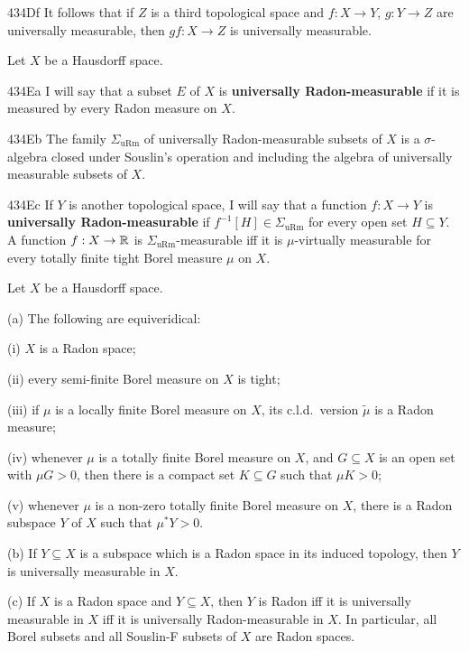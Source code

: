 \spheader 434Df It follows that if $Z$ is a third topological space
and $f:X\to Y$, $g:Y\to Z$ are universally measurable, then $gf:X\to Z$
is universally measurable.

 Let $X$ be a Hausdorff space.

\spheader 434Ea I will say that a
subset $E$ of $X$ is {\bf universally Radon-measurable} if it is
measured by every Radon measure on $X$.

\spheader 434Eb The family
$\Sigma_{\text{uRm}}$ of universally Radon-measurable subsets of $X$ is
a $\sigma$-algebra closed under Souslin's operation and including the
algebra
of universally measurable subsets of $X$.   

\spheader 434Ec If $Y$ is another topological space, I will say that a function
$f:X\to Y$ is {\bf universally
Radon-measurable} if $f^{-1}[H]\in\Sigma_{\text{uRm}}$ for every open set
$H\subseteq Y$.   A function $f:X\to\Bbb R$ is
$\Sigma_{\text{uRm}}$-measurable iff it is $\mu$-virtually measurable
for every totally finite tight Borel measure $\mu$ on $X$.

Let $X$ be a Hausdorff space.

(a) The following are equiveridical:

\quad(i) $X$ is a Radon space;

\quad(ii) every semi-finite Borel measure on $X$ is tight;

\quad(iii) if $\mu$ is a locally finite Borel measure on $X$, its
c.l.d.\ version $\tilde\mu$ is a Radon measure;

\quad(iv) whenever $\mu$ is a totally finite Borel measure on $X$, and
$G\subseteq X$ is an open set with $\mu G>0$, then there is a compact
set $K\subseteq G$ such that $\mu K>0$;

\quad(v) whenever $\mu$ is a non-zero totally finite Borel measure on
$X$, there is a Radon subspace $Y$ of $X$ such that $\mu^*Y>0$.

(b) If $Y\subseteq X$ is a subspace which is a Radon space in its
induced topology, then $Y$ is universally measurable in $X$.

(c) If $X$ is a Radon space and $Y\subseteq X$,
then $Y$ is Radon iff it is universally measurable in $X$ iff it is
universally Radon-measurable in $X$.
In particular, all Borel subsets and all Souslin-F subsets of $X$ are
Radon spaces.

